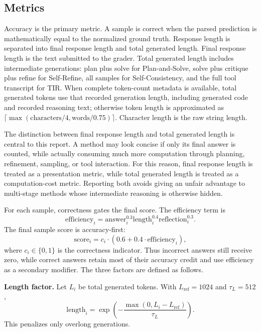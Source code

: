 \documentclass[conference]{IEEEtran}
\begin{document}
\subsection{Metrics}
Accuracy is the primary metric. A sample is correct when the parsed prediction is mathematically equal to the normalized ground truth. Response length is separated into final response length and total generated length. Final response length is the text submitted to the grader. Total generated length includes intermediate generations: plan plus solve for Plan-and-Solve, solve plus critique plus refine for Self-Refine, all samples for Self-Consistency, and the full tool transcript for TIR. When complete token-count metadata is available, total generated tokens use that recorded generation length, including generated code and recorded reasoning text; otherwise token length is approximated as $\lceil\max(\text{characters}/4,\text{words}/0.75)\rceil$. Character length is the raw string length.

The distinction between final response length and total generated length is central to this report. A method may look concise if only its final answer is counted, while actually consuming much more computation through planning, refinement, sampling, or tool interaction. For this reason, final response length is treated as a presentation metric, while total generated length is treated as a computation-cost metric. Reporting both avoids giving an unfair advantage to multi-stage methods whose intermediate reasoning is otherwise hidden.

For each sample, correctness gates the final score. The efficiency term is
\begin{equation}
\text{efficiency}_i =
\text{answer}^{0.3}_i
\text{length}^{0.4}_i
\text{reflection}^{0.3}_i.
\end{equation}
The final sample score is accuracy-first:
\begin{equation}
\text{score}_i = c_i \cdot \left(0.6 + 0.4 \cdot \text{efficiency}_i\right),
\end{equation}
where $c_i \in \{0,1\}$ is the correctness indicator. Thus incorrect answers still receive zero, while correct answers retain most of their accuracy credit and use efficiency as a secondary modifier. The three factors are defined as follows.

\textbf{Length factor.} Let $L_i$ be total generated tokens. With $L_{\text{ref}}=1024$ and $\tau_L=512$, 
\begin{equation}
\text{length}_i=\exp\left(-\frac{\max(0,L_i-L_{\text{ref}})}{\tau_L}\right).
\end{equation}
This penalizes only overlong generations.
\end{document}
